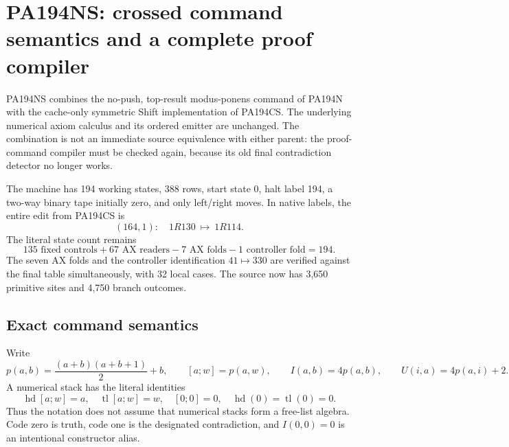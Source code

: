 \section{PA194NS: crossed command semantics and a complete proof compiler}
\label{sec:ns-proof}

PA194NS combines the no-push, top-result modus-ponens command of PA194N
with the cache-only symmetric Shift implementation of PA194CS.
The underlying numerical axiom calculus and its ordered emitter are
unchanged. The combination is not an immediate source equivalence with
either parent: the proof-command compiler must be checked again, because
its old final contradiction detector no longer works.

The machine has 194 working states, 388 rows, start state 0, halt label 194,
a two-way binary tape initially zero, and only left/right moves. In native
labels, the entire edit from PA194CS is
\[
 (164,1):\quad 1R130\ \longmapsto\ 1R114.
\]
The literal state count remains
\[
 135\text{ fixed controls}+67\text{ AX readers}
       -7\text{ AX folds}-1\text{ controller fold}=194.
\]
The seven AX folds and the controller identification $41\mapsto330$ are
verified against the final table simultaneously, with 32 local cases.
The source now has 3,650 primitive sites and 4,750 branch outcomes.

\subsection{Exact command semantics}

Write
\[
 p(a,b)=\frac{(a+b)(a+b+1)}2+b,\qquad [a;w]=p(a,w),
 \qquad I(a,b)=4p(a,b),\qquad U(i,a)=4p(a,i)+2.
\]
A numerical stack has the literal identities
\[
 \operatorname{hd}[a;w]=a,\quad\operatorname{tl}[a;w]=w,
 \quad[0;0]=0,\quad\operatorname{hd}(0)=\operatorname{tl}(0)=0.
\]
Thus the notation does not assume that numerical stacks form a free-list
algebra. Code zero is truth, code one is the designated contradiction,
and $I(0,0)=0$ is an intentional constructor alias.

